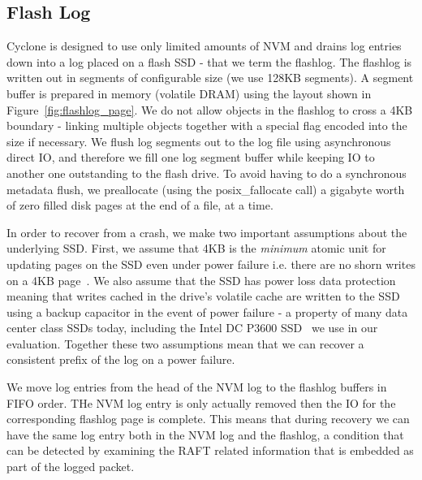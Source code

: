 \documentclass[10pt, preprint, nonatbib]{sigplanconf}
\begin{document}
\subsection{Flash Log}
Cyclone is designed to use only limited amounts of NVM and drains log entries
down into a log placed on a flash SSD - that we term the flashlog. The flashlog
is written out in segments of configurable size (we use 128KB segments). A
segment buffer is prepared in memory (volatile DRAM) using the layout shown in
Figure~\ref{fig:flashlog_page}. We do not allow objects in the flashlog to cross
a 4KB boundary - linking multiple objects together with a special flag encoded
into the size if necessary. We flush log segments out to the log file using
asynchronous direct IO, and therefore we fill one log segment buffer while
keeping IO to another one outstanding to the flash drive. To avoid having to do
a synchronous metadata flush, we preallocate (using the posix\_fallocate call) a
gigabyte worth of zero filled disk pages at the end of a file, at a time.

In order to recover from a crash, we make two important assumptions about the
underlying SSD. First, we assume that 4KB is the \emph{minimum} atomic unit for
updating pages on the SSD even under power failure i.e. there are no shorn
writes on a 4KB page~\cite{shorn_writes}. We also assume that the SSD has power
loss data protection meaning that writes cached in the drive's volatile cache
are written to the SSD using a backup capacitor in the event of power failure -
a property of many data center class SSDs today, including the Intel DC P3600
SSD~\cite{ssd_spec} we use in our evaluation. Together these two assumptions
mean that we can recover a consistent prefix of the log on a power failure.

We move log entries from the head of the NVM log to the flashlog buffers in FIFO
order. THe NVM log entry is only actually removed then the IO for the
corresponding flashlog page is complete. This means that during recovery we can
have the same log entry both in the NVM log and the flashlog, a condition that
can be detected by examining the RAFT related information that is embedded as
part of the logged packet.
\end{document}
